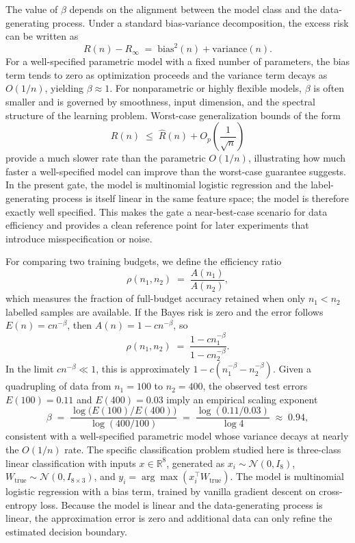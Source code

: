 \documentclass[10pt]{article}
\begin{document}
The value of \(\beta\) depends on the alignment between the model class and the data-generating process. Under a standard bias-variance decomposition, the excess risk can be written as
\[
R(n) - R_\infty \;=\; \mathrm{bias}^2(n) + \mathrm{variance}(n).
\]
For a well-specified parametric model with a fixed number of parameters, the bias term tends to zero as optimization proceeds and the variance term decays as \(O(1/n)\), yielding \(\beta \approx 1\). For nonparametric or highly flexible models, \(\beta\) is often smaller and is governed by smoothness, input dimension, and the spectral structure of the learning problem. Worst-case generalization bounds of the form
\[
R(n) \;\le\; \widehat{R}(n) + O_p\!\left(\frac{1}{\sqrt{n}}\right)
\]
provide a much slower rate than the parametric \(O(1/n)\), illustrating how much faster a well-specified model can improve than the worst-case guarantee suggests. In the present gate, the model is multinomial logistic regression and the label-generating process is itself linear in the same feature space; the model is therefore exactly well specified. This makes the gate a near-best-case scenario for data efficiency and provides a clean reference point for later experiments that introduce misspecification or noise.

For comparing two training budgets, we define the efficiency ratio
\[
\rho(n_1, n_2) \;=\; \frac{A(n_1)}{A(n_2)},
\]
which measures the fraction of full-budget accuracy retained when only \(n_1 < n_2\) labelled samples are available. If the Bayes risk is zero and the error follows \(E(n) = c n^{-\beta}\), then \(A(n) = 1 - c n^{-\beta}\), so
\[
\rho(n_1, n_2) \;=\; \frac{1 - c n_1^{-\beta}}{1 - c n_2^{-\beta}}.
\]
In the limit \(c n^{-\beta} \ll 1\), this is approximately \(1 - c(n_1^{-\beta} - n_2^{-\beta})\). Given a quadrupling of data from \(n_1 = 100\) to \(n_2 = 400\), the observed test errors \(E(100) = 0.11\) and \(E(400) = 0.03\) imply an empirical scaling exponent
\[
\beta \;=\; \frac{\log\!\bigl(E(100)/E(400)\bigr)}{\log(400/100)}
\;=\; \frac{\log(0.11/0.03)}{\log 4}
\;\approx\; 0.94,
\]
consistent with a well-specified parametric model whose variance decays at nearly the \(O(1/n)\) rate. The specific classification problem studied here is three-class linear classification with inputs \(x \in \mathbb{R}^8\), generated as \(x_i \sim \mathcal{N}(0, I_8)\), \(W_{\mathrm{true}} \sim \mathcal{N}(0, I_{8 \times 3})\), and \(y_i = \arg\max(x_i^\top W_{\mathrm{true}})\). The model is multinomial logistic regression with a bias term, trained by vanilla gradient descent on cross-entropy loss. Because the model is linear and the data-generating process is linear, the approximation error is zero and additional data can only refine the estimated decision boundary.
\end{document}
